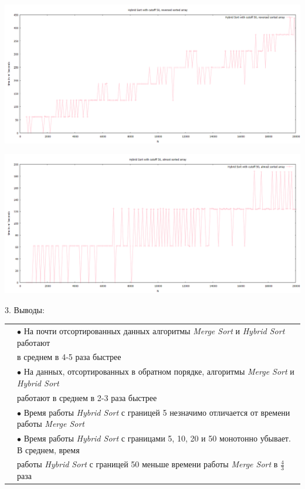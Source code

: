 \documentclass[11pt,a4paper]{article}
\begin{document}
\hspace*{-2cm} \includegraphics[scale=0.5]{hybrid_sort_50_reversed_sorted_data.PNG}

\hspace*{-2cm} \includegraphics[scale=0.5]{hybrid_sort_50_almost_sorted_data.PNG}


3. Выводы:

\begin{tabular}{rl}
    & $\bullet$ На почти отсортированных данных алгоритмы
    \textit{Merge Sort} и \textit{Hybrid Sort} работают \\
    & в среднем в 4-5 раза быстрее \\

    & $\bullet$ На данных, отсортированных в обратном порядке,
    алгоритмы \textit{Merge Sort} и \textit{Hybrid Sort} \\
    & работают в среднем в 2-3 раза быстрее \\

    & $\bullet$ Время работы \textit{Hybrid Sort} с границей
    5 незначимо отличается от времени работы \textit{Merge Sort} \\

    & $\bullet$ Время работы \textit{Hybrid Sort} с границами
    5, 10, 20 и 50 монотонно убывает. В среднем, время \\
    & работы \textit{Hybrid Sort} с границей 50 меньше
    времени работы \textit{Merge Sort} в $\frac{4}{3}$ раза \\
\end{tabular}
\\
\end{document}
